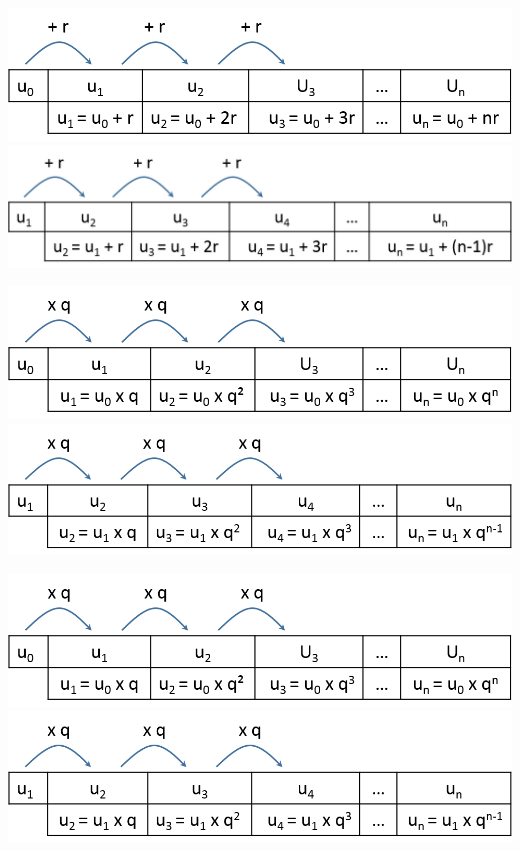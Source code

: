 \documentclass[12pt,a4paper]{article}
\begin{document}
\begin{multicols}{2}
	\includegraphics[scale=0.45]{./img/arith1}
	\includegraphics[scale=0.45]{./img/arith2}
\end{multicols}








\begin{multicols}{2}
	\includegraphics[scale=0.45]{./img/geo1}
	\includegraphics[scale=0.45]{./img/geo2}
\end{multicols}


\begin{multicols}{2}
	\includegraphics[scale=0.45]{./img/geo1}
	\includegraphics[scale=0.45]{./img/geo2}
\end{multicols}
\end{document}
